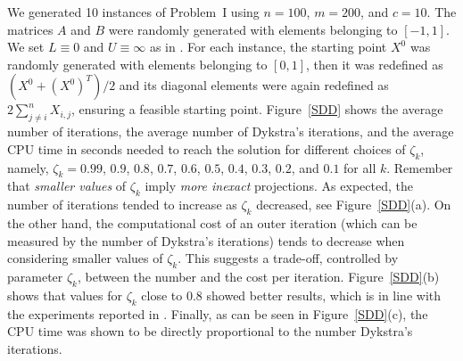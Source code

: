 We generated 10 instances of Problem~I using $n=100$, $m=200$, and $c=10$. The matrices $A$ and $B$ were randomly generated with elements belonging to $[-1,1]$. We set $L\equiv 0$ and $U\equiv \infty$ as in \cite{BirginMartinezRaydan2003}. For each instance, the starting point $X^0$ was randomly generated with elements belonging to $[0,1]$, then it was redefined as $(X^0 + (X^0)^T )/2$ and its diagonal elements were again redefined as $2\sum_{j\neq i}^n X_{i,j}$, ensuring a feasible starting point. Figure~\ref{SDD} shows the average number of iterations,  the average number of Dykstra’s iterations, and the average  CPU time in seconds needed to reach the solution for different choices of $\zeta_k$, namely, $\zeta_k=0.99$, $0.9$, $0.8$, $0.7$, $0.6$, $0.5$, $0.4$, $0.3$, $0.2$, and $0.1$ for all $k$.
Remember that {\it smaller values} of  $\zeta_k$ imply {\it more inexact} projections. As expected, the number of iterations  tended to increase as $\zeta_k$ decreased, see  Figure~\ref{SDD}(a).
On the other hand, the computational cost of an outer iteration (which can be measured by the number of Dykstra’s iterations) tends to decrease when considering smaller values of $\zeta_k$.
This suggests a trade-off, controlled by parameter $\zeta_k$, between the number and the cost per iteration.
Figure~\ref{SDD}(b) shows that values for $\zeta_k$ close to 0.8 showed better results, which is in line with the experiments reported in \cite{BirginMartinezRaydan2003}.
Finally, as can be seen in Figure~\ref{SDD}(c), the CPU time was shown to be directly proportional to the number Dykstra’s iterations.
